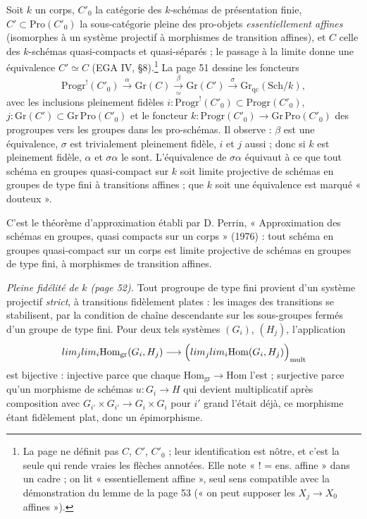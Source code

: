 \documentclass[11pt,a4paper]{article}
\begin{document}
Soit $k$ un corps, $C'_0$ la catégorie des $k$-schémas de présentation finie,
$C' \subset \mathrm{Pro}(C'_0)$ la sous-catégorie pleine des pro-objets
\emph{essentiellement affines} (isomorphes à un système projectif à morphismes
de transition affines), et $C$ celle des $k$-schémas quasi-compacts et
quasi-séparés ; le passage à la limite donne une équivalence $C' \simeq C$
(EGA IV, §8).\footnote{La page ne définit pas $C$, $C'$, $C'_0$ ; leur
identification est nôtre, et c'est la seule qui rende vraies les flèches
annotées. Elle note « ! = ens. affine » dans un cadre ; on lit « essentiellement
affine », seul sens compatible avec la démonstration du lemme de la page 53
(« on peut supposer les $X_j \to X_0$ affines »).} La page 51 dessine les
foncteurs
\[
\mathrm{Progr}^{!}(C'_0) \xrightarrow{\ \alpha\ } \mathrm{Gr}(C)
\xrightarrow[\ \simeq\ ]{\ \beta\ } \mathrm{Gr}(C') \xrightarrow{\ \sigma\ }
\mathrm{Gr}_{\mathrm{qc}}(\mathrm{Sch}/k),
\]
avec les inclusions pleinement fidèles $i : \mathrm{Progr}^{!}(C'_0) \subset
\mathrm{Progr}(C'_0)$, $j : \mathrm{Gr}(C') \subset \mathrm{Gr}\,\mathrm{Pro}(C'_0)$
et le foncteur $k : \mathrm{Progr}(C'_0) \to \mathrm{Gr}\,\mathrm{Pro}(C'_0)$ des
progroupes vers les groupes dans les pro-schémas. Il observe : $\beta$ est une
équivalence, $\sigma$ est trivialement pleinement fidèle, $i$ et $j$ aussi ;
donc si $k$ est pleinement fidèle, $\alpha$ et $\sigma\alpha$ le sont.
L'équivalence de $\sigma\alpha$ équivaut à ce que tout schéma en groupes
quasi-compact sur $k$ soit limite projective de schémas en groupes de type fini
à transitions affines ; que $k$ soit une équivalence est marqué « douteux ».

C'est le théorème d'approximation établi par D. Perrin, « Approximation des
schémas en groupes, quasi compacts sur un corps » (1976) : tout schéma en
groupes quasi-compact sur un corps est limite projective de schémas en groupes
de type fini, à morphismes de transition affines.

\emph{Pleine fidélité de $k$ (page 52).} Tout progroupe de type fini provient
d'un système projectif \emph{strict}, à transitions fidèlement plates : les
images des transitions se stabilisent, par la condition de chaîne descendante
sur les sous-groupes fermés d'un groupe de type fini. Pour deux tels systèmes
$(G_i)$, $(H_j)$, l'application
\[
\varprojlim_j \varinjlim_i \mathrm{Hom}_{\mathrm{gr}}(G_i, H_j) \longrightarrow
\Bigl(\varprojlim_j \varinjlim_i \mathrm{Hom}(G_i, H_j)\Bigr)_{\mathrm{mult}}
\]
est bijective : injective parce que chaque $\mathrm{Hom}_{\mathrm{gr}} \to
\mathrm{Hom}$ l'est ; surjective parce qu'un morphisme de schémas $u : G_i \to
H$ qui devient multiplicatif après composition avec $G_{i'} \times G_{i'} \to G_i
\times G_i$ pour $i'$ grand l'était déjà, ce morphisme étant fidèlement plat,
donc un épimorphisme.
\end{document}
